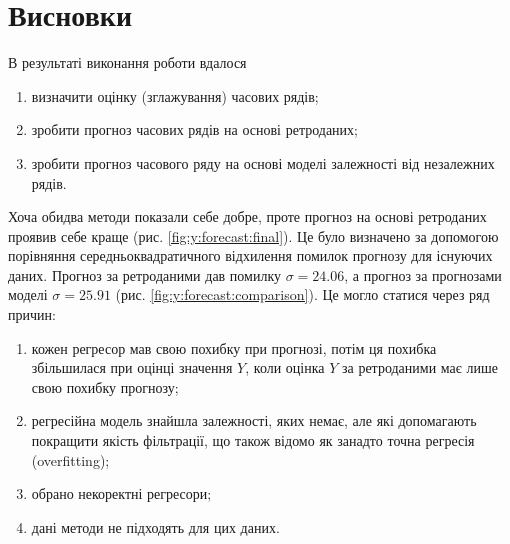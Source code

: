 \chapter*{Висновки}

В результаті виконання роботи вдалося
\begin{enumerate}
  \item визначити оцінку (зглажування) часових рядів;
  \item зробити прогноз часових рядів на основі ретроданих;
  \item зробити прогноз часового ряду на основі моделі залежності
    від незалежних рядів.
\end{enumerate}

Хоча обидва методи показали себе добре,
проте прогноз на основі ретроданих проявив себе краще
(рис. \ref{fig:y:forecast:final}).
Це було визначено за допомогою порівняння середньоквадратичного відхилення
помилок прогнозу для існуючих даних.
Прогноз за ретроданими дав помилку $\sigma = 24.06$,
а прогноз за прогнозами моделі $\sigma = 25.91$
(рис. \ref{fig:y:forecast:comparison}).
Це могло статися через ряд причин:
\begin{enumerate}
  \item кожен регресор мав свою похибку при прогнозі,
    потім ця похибка збільшилася при оцінці значення $Y$,
    коли оцінка $Y$ за ретроданими має лише свою похибку прогнозу;
  \item регресійна модель знайшла залежності, яких немає,
    але які допомагають покращити якість фільтрації,
    що також відомо як занадто точна регресія (overfitting);
    \cite{overfitting}
  \item обрано некоректні регресори;
  \item дані методи не підходять для цих даних.
\end{enumerate}

